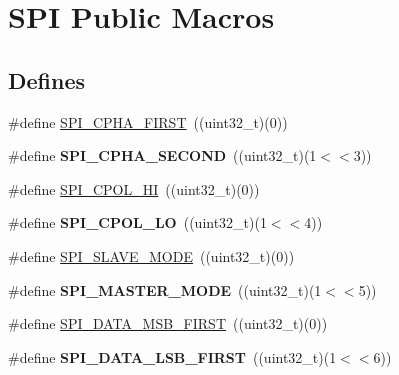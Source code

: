 \hypertarget{group___s_p_i___public___macros}{\section{\-S\-P\-I \-Public \-Macros}
\label{group___s_p_i___public___macros}
}
\subsection*{\-Defines}
\begin{DoxyCompactItemize}
\item 
\#define \hyperlink{group___s_p_i___public___macros_gab7c5fc382a31cde4a337edc1f71da83b}{\-S\-P\-I\-\_\-\-C\-P\-H\-A\-\_\-\-F\-I\-R\-S\-T}~((uint32\-\_\-t)(0))
\item 
\hypertarget{group___s_p_i___public___macros_gaab7e4e7320cf5ce4bbd3c8ac57441626}{\#define {\bfseries \-S\-P\-I\-\_\-\-C\-P\-H\-A\-\_\-\-S\-E\-C\-O\-N\-D}~((uint32\-\_\-t)(1$<$$<$3))}\label{group___s_p_i___public___macros_gaab7e4e7320cf5ce4bbd3c8ac57441626}

\item 
\#define \hyperlink{group___s_p_i___public___macros_gacceaa0635df4917c6300093ed8d85ee4}{\-S\-P\-I\-\_\-\-C\-P\-O\-L\-\_\-\-H\-I}~((uint32\-\_\-t)(0))
\item 
\hypertarget{group___s_p_i___public___macros_gab0c3271176577b5c2a46836d5fc048fd}{\#define {\bfseries \-S\-P\-I\-\_\-\-C\-P\-O\-L\-\_\-\-L\-O}~((uint32\-\_\-t)(1$<$$<$4))}\label{group___s_p_i___public___macros_gab0c3271176577b5c2a46836d5fc048fd}

\item 
\#define \hyperlink{group___s_p_i___public___macros_ga6937829c8e8c6b3907faed0da21faa6c}{\-S\-P\-I\-\_\-\-S\-L\-A\-V\-E\-\_\-\-M\-O\-D\-E}~((uint32\-\_\-t)(0))
\item 
\hypertarget{group___s_p_i___public___macros_gacaf98f1876f8d084f0136bf7e8c2f8d4}{\#define {\bfseries \-S\-P\-I\-\_\-\-M\-A\-S\-T\-E\-R\-\_\-\-M\-O\-D\-E}~((uint32\-\_\-t)(1$<$$<$5))}\label{group___s_p_i___public___macros_gacaf98f1876f8d084f0136bf7e8c2f8d4}

\item 
\#define \hyperlink{group___s_p_i___public___macros_gaa86b44b85ddf5f62645839fa4871d93f}{\-S\-P\-I\-\_\-\-D\-A\-T\-A\-\_\-\-M\-S\-B\-\_\-\-F\-I\-R\-S\-T}~((uint32\-\_\-t)(0))
\item 
\hypertarget{group___s_p_i___public___macros_ga6c3a8b21321ff010d6d392adfc01fe62}{\#define {\bfseries \-S\-P\-I\-\_\-\-D\-A\-T\-A\-\_\-\-L\-S\-B\-\_\-\-F\-I\-R\-S\-T}~((uint32\-\_\-t)(1$<$$<$6))}\label{group___s_p_i___public___macros_ga6c3a8b21321ff010d6d392adfc01fe62}


\end{DoxyCompactItemize}
